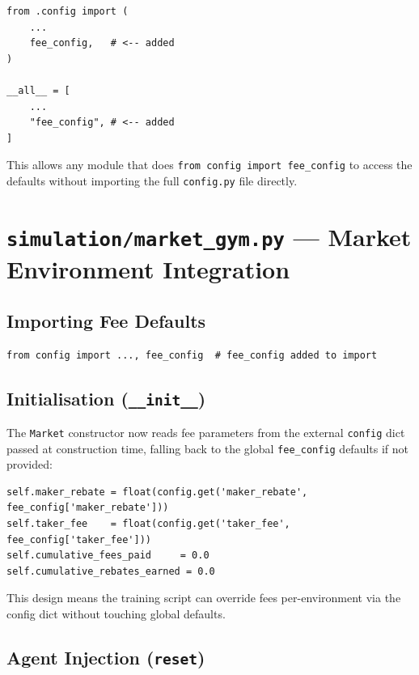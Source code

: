 \documentclass[11pt,a4paper]{article}
\begin{document}
\begin{lstlisting}
from .config import (
    ...
    fee_config,   # <-- added
)

__all__ = [
    ...
    "fee_config", # <-- added
]
\end{lstlisting}

This allows any module that does \lstinline{from config import fee_config} to
access the defaults without importing the full \texttt{config.py} file directly.

\section{\texttt{simulation/market\_gym.py} — Market Environment Integration}

\subsection{Importing Fee Defaults}

\begin{lstlisting}
from config import ..., fee_config  # fee_config added to import
\end{lstlisting}

\subsection{Initialisation (\texttt{\_\_init\_\_})}

The \texttt{Market} constructor now reads fee parameters from the external
\texttt{config} dict passed at construction time, falling back to the
global \texttt{fee\_config} defaults if not provided:

\begin{lstlisting}
self.maker_rebate = float(config.get('maker_rebate', fee_config['maker_rebate']))
self.taker_fee    = float(config.get('taker_fee',    fee_config['taker_fee']))
self.cumulative_fees_paid     = 0.0
self.cumulative_rebates_earned = 0.0
\end{lstlisting}

This design means the training script can override fees per-environment
via the config dict without touching global defaults.

\subsection{Agent Injection (\texttt{reset})}
\end{document}
